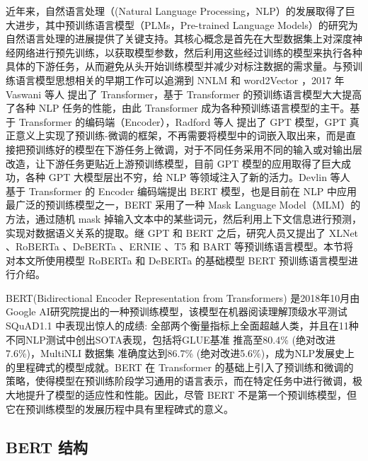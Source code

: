 近年来，自然语言处理（(Natural Language Processing，NLP）的发展取得了巨大进步，其中预训练语言模型（PLMs，Pre-trained Language Models）的研究为自然语言处理的进展提供了关键支持。其核心概念是首先在大型数据集上对深度神经网络进行预先训练，以获取模型参数，然后利用这些经过训练的模型来执行各种具体的下游任务，从而避免从头开始训练模型并减少对标注数据的需求量。与预训练语言模型思想相关的早期工作可以追溯到 NNLM \cite{NNLM} 和 word2Vector \cite{mikolov2013efficientestimationwordrepresentations}，2017 年 Vaswani 等人 \cite{transformer} 提出了 Transformer，基于 Transformer 的预训练语言模型大大提高了各种 NLP 任务的性能，由此 Transformer 成为各种预训练语言模型的主干。基于 Transformer 的编码端（Encoder），Radford 等人 \cite{gpt} 提出了 GPT 模型，GPT 真正意义上实现了预训练-微调的框架，不再需要将模型中的词嵌入取出来，而是直接把预训练好的模型在下游任务上微调，对于不同任务采用不同的输入或对输出层改造，让下游任务更贴近上游预训练模型，目前 GPT 模型的应用取得了巨大成功，各种 GPT 大模型层出不穷，给 NLP 等领域注入了新的活力。Devlin 等人 \cite{devlin_bert_2019} 基于 Transformer 的 Encoder 编码端提出 BERT 模型，也是目前在 NLP 中应用最广泛的预训练模型之一，BERT 采用了一种 Mask Language Model（MLM）的方法，通过随机 mask 掉输入文本中的某些词元，然后利用上下文信息进行预测，实现对数据语义关系的提取。继 GPT 和 BERT 之后，研究人员又提出了 XLNet \cite{XLNet}、RoBERTa \cite{liu_roberta_2019}、DeBERTa \cite{he_deberta_2021} 、ERNIE \cite{sun2019ernieenhancedrepresentationknowledge}、T5 \cite{T5} 和 BART \cite{lewis-etal-2020-bart} 等预训练语言模型。本节将对本文所使用模型 RoBERTa 和 DeBERTa 的基础模型 BERT 预训练语言模型进行介绍。

BERT(Bidirectional Encoder Representation from Transformers)\cite{devlin_bert_2019} 是2018年10月由Google AI研究院提出的一种预训练模型，该模型在机器阅读理解顶级水平测试SQuAD1.1 \cite{rajpurkar2016squad100000questionsmachine} 中表现出惊人的成绩: 全部两个衡量指标上全面超越人类，并且在11种不同NLP测试中创出SOTA表现，包括将GLUE基准 \cite{wang2019gluemultitaskbenchmarkanalysis} 推高至80.4\% (绝对改进7.6\%)，MultiNLI 数据集 \cite{williams2018broadcoveragechallengecorpussentencemultinli} 准确度达到86.7\% (绝对改进5.6\%)，成为NLP发展史上的里程碑式的模型成就。BERT 在 Transformer 的基础上引入了预训练和微调的策略，使得模型在预训练阶段学习通用的语言表示，而在特定任务中进行微调，极大地提升了模型的适应性和性能。因此，尽管 BERT 不是第一个预训练模型，但它在预训练模型的发展历程中具有里程碑式的意义。

\subsection{BERT 结构}

